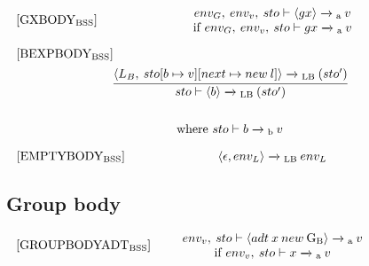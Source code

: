\begin{equation}
\begin{minipage}{.2\linewidth}
$[\text{GXBODY}_\text{BSS}]$
\end{minipage}
\\
\begin{minipage}{.8\linewidth}
\centering
$env_G, \: env_v, \: sto \vdash \langle gx \rangle \xrightarrow{}\textsubscript{a} \: v $
\\
if $env_G, \: env_v, \: sto \vdash gx \xrightarrow{}\textsubscript{a} \: v$
\end{minipage}
\end{equation}

\begin{equation}
\begin{split}
\begin{minipage}{\linewidth}
$[\text{BEXPBODY}_\text{BSS}]$
\end{minipage}
\\
\begin{minipage}{\linewidth}
\centering
$\cfrac{\langle L_B, \: sto[b \mapsto v][next \mapsto new \: l]\rangle \xrightarrow{}\textsubscript{LB} \: (sto') }{sto \vdash \langle b \rangle \xrightarrow{}\textsubscript{LB} \: (sto')}$
\end{minipage}
\\\\
\begin{minipage}{\linewidth}
\centering
where $sto \vdash b \xrightarrow{}\textsubscript{b} \: v$
\end{minipage}
\end{split}
\end{equation}


\begin{equation}
\begin{minipage}{.2\linewidth}
$[\text{EMPTYBODY}_\text{BSS}]$
\end{minipage}
\begin{minipage}{.8\linewidth}
\centering
$\langle \epsilon, env_L \rangle \xrightarrow{}\textsubscript{LB} \: env_L $
\end{minipage}
\end{equation}

\subsection{Group body}
\begin{equation}
\begin{minipage}{.2\linewidth}
$[\text{GROUPBODYADT}_\text{BSS}]$
\end{minipage}
\\
\begin{minipage}{.8\linewidth}
\centering
$env_v, \: sto \vdash \langle adt \: x \: new \: \text{G\textsubscript{B}} \rangle \xrightarrow{}\textsubscript{a} \: v $
\\if $env_v, \: sto \vdash x \xrightarrow{} \textsubscript{a} \: v$
\end{minipage}
\end{equation}


